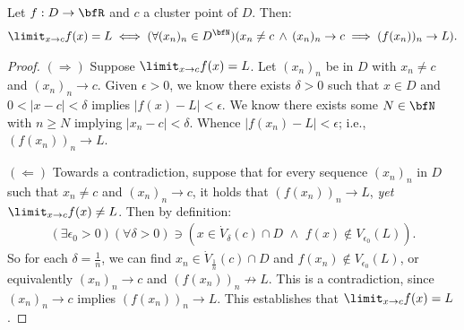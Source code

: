     \begin{proposition}
        Let $f:D \rightarrow \bfR$ and $c$ a cluster point of $D$. Then:
            \begin{equation*}
            \begin{split}
                \limit_{x \rightarrow c}f(x) = L \iff (\forall (x_n)_n \in D^\bfN)(x_n \neq c \hspace{2pt}\land\hspace{2pt} (x_n)_n \rightarrow c \implies (f(x_n))_n \rightarrow L).
            \end{split}
            \end{equation*}
    \end{proposition}
        \begin{proof}
            $(\Rightarrow)$ Suppose $\limit_{x \rightarrow c}f(x) = L$. Let $(x_n)_n$ be in $D$ with $x_n \neq c$ and $(x_n)_n \rightarrow c$. Given $\epsilon > 0$, we know there exists $\delta > 0$ such that $x \in D$ and $0 < |x-c| < \delta$ implies $|f(x)-L| < \epsilon$. We know there exists some $N \in \bfN$ with $n\geq N$ implying $|x_n - c| < \delta$. Whence $|f(x_n) - L| < \epsilon$; i.e., $(f(x_n))_n \rightarrow L$.

            $(\Leftarrow)$ Towards a contradiction, suppose that for every sequence $(x_n)_n$ in $D$ such that $x_n \neq c$ and $(x_n)_n \rightarrow c$, it holds that $(f(x_n))_n \rightarrow L$, \textit{yet} $\limit_{x \rightarrow c}f(x) \neq L$. Then by definition:
                \begin{equation*}
                \begin{split}
                    (\exists \epsilon_0 > 0)(\forall \delta >0) \ni (x \in \dot{V}_\delta(c)\cap D \hspace{4pt}\land\hspace{4pt} f(x) \not\in V_{\epsilon_0}(L)).
                \end{split}
                \end{equation*}
            So for each $\delta = \frac{1}{n}$, we can find $x_n \in \dot{V}_{\frac{1}{n}}(c) \cap D$ and $f(x_n) \not\in V_{\epsilon_0}(L)$, or equivalently $(x_n)_n \rightarrow c$ and $(f(x_n))_n \not\rightarrow L$. This is a contradiction, since $(x_n)_n \rightarrow c$ implies $(f(x_n))_n \rightarrow L$. This establishes that $\limit_{x \rightarrow c}f(x) = L$.
        \end{proof}

